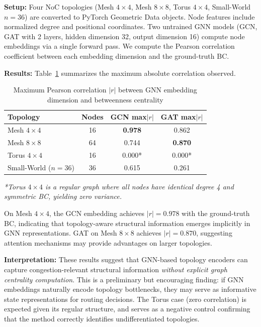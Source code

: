 \documentclass[conference]{IEEEtran}
\begin{document}
\textbf{Setup:} Four NoC topologies (Mesh $4\times4$, Mesh $8\times8$, Torus $4\times4$, Small-World $n=36$) are converted to PyTorch Geometric Data objects. Node features include normalized degree and positional coordinates. Two untrained GNN models (GCN, GAT with 2 layers, hidden dimension 32, output dimension 16) compute node embeddings via a single forward pass. We compute the Pearson correlation coefficient between each embedding dimension and the ground-truth BC.

\textbf{Results:} Table~\ref{tab:correlation} summarizes the maximum absolute correlation observed.

\begin{table}[h]
\centering
\caption{Maximum Pearson correlation $|r|$ between GNN embedding dimension and betweenness centrality}
\label{tab:correlation}
\small
\begin{tabular}{lccc}
\toprule
\textbf{Topology} & \textbf{Nodes} & \textbf{GCN max$|r|$} & \textbf{GAT max$|r|$} \\
\midrule
Mesh $4\times4$ & 16 & \textbf{0.978} & 0.862 \\
Mesh $8\times8$ & 64 & 0.744 & \textbf{0.870} \\
Torus $4\times4$ & 16 & 0.000* & 0.000* \\
Small-World ($n=36$) & 36 & 0.615 & 0.261 \\
\bottomrule
\end{tabular}
\vspace{2mm}
\small\textit{*Torus $4\times4$ is a regular graph where all nodes have identical degree 4 and symmetric BC, yielding zero variance.}
\end{table}

On Mesh $4\times4$, the GCN embedding achieves $|r| = 0.978$ with the ground-truth BC, indicating that topology-aware structural information emerges implicitly in GNN representations. GAT on Mesh $8\times8$ achieves $|r| = 0.870$, suggesting attention mechanisms may provide advantages on larger topologies.

\textbf{Interpretation:} These results suggest that GNN-based topology encoders can capture congestion-relevant structural information \emph{without explicit graph centrality computation}. This is a preliminary but encouraging finding: if GNN embeddings naturally encode topology bottlenecks, they may serve as informative state representations for routing decisions. The Torus case (zero correlation) is expected given its regular structure, and serves as a negative control confirming that the method correctly identifies undifferentiated topologies.
\end{document}
